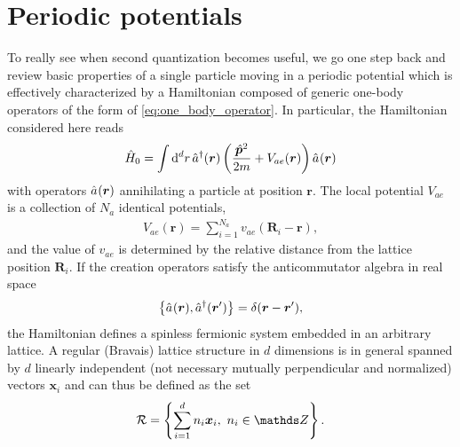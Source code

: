 \section{Periodic potentials}
\label{sec:periodic_potentials}
To really see when second quantization becomes useful, we go one step back and review basic properties of a single particle moving in a periodic potential which is effectively characterized by a Hamiltonian composed of generic one-body operators of the form of \cref{eq:one_body_operator}.
In particular, the Hamiltonian considered here reads
\begin{align}
    \hat H_0 = \int\rd^d r\, \hat a^\dag({\bm r})\brlr{\frac{\hat{\bm p}^2}{2m}+V_{ae}({\bm r})}\hat a^\pdag({\bm r})
\end{align}
with operators $\hat a^\pdag({\bm r})$ annihilating a particle at position $\bm r$.
The local potential $V_{ae}$ is a collection of $N_a$ identical potentials,
\begin{align}
    V_{ae}({\bm r}) = \sum_{i=1}^{N_a}v_{ae}({\bm R}_i - {\bm r}),
\end{align}
and the value of $v_{ae}$ is determined by the relative distance from the lattice position ${\bm R}_i$.
If the creation operators satisfy the anticommutator algebra in real space
\begin{align}
    \anticommutator{\hat a^\pdag({\bm r}),\hat a^\dag({\bm r'})}=\delta({\bm r}-{\bm r'}),
\end{align}
the Hamiltonian defines a spinless fermionic system embedded in an arbitrary lattice.
A regular (Bravais) lattice structure in $d$ dimensions is in general spanned by $d$ linearly independent (not necessary mutually perpendicular and normalized) vectors ${\bm x}_i$ and can thus be defined as the set
\begin{align}
    \mathcal{R} = \anticommutator{\sum_{i=1}^d n_i {\bm x}_i,\ n_i\in\mathds Z}.
\end{align}
